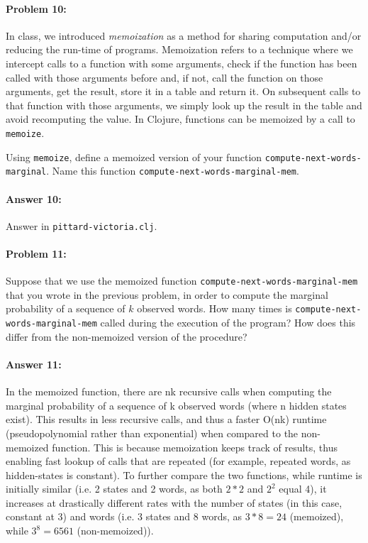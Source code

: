 \documentclass[10pt]{article}
\begin{document}
\hrulefill
\paragraph{Problem 10:}
In class, we introduced \emph{memoization} as a method for sharing
computation and/or reducing the run-time of programs. Memoization
refers to a technique where we intercept calls to a function with some
arguments, check if the function has been called with those arguments
before and, if not, call the function on those arguments, get the
result, store it in a table and return it. On subsequent calls to that
function with those arguments, we simply look up the result in the
table and avoid recomputing the value. In Clojure, functions can be
memoized by a call to \texttt{memoize}.

Using \texttt{memoize}, define a memoized version of your function
\texttt{compute-next-words-marginal}. Name this function
\texttt{compute-next-words-marginal-mem}.


\paragraph{Answer 10:} Answer in
\texttt{pittard-victoria.clj}.

\hrulefill
\paragraph{Problem 11:}
Suppose that we use the memoized function
\texttt{compute-next-words-marginal-mem} that you wrote in the
previous problem, in order to compute the marginal probability of a
sequence of $k$ observed words. How many times is
\texttt{compute-next-words-marginal-mem} called during the execution
of the program? How does this differ from the non-memoized version of
the procedure?


\paragraph{Answer 11:} In the memoized function, there are nk recursive calls when computing the marginal probability of a sequence of k observed words (where n hidden states exist). This results in less recursive calls, and thus a faster O(nk) runtime (pseudopolynomial rather than exponential) when compared to the non-memoized function. This is because memoization keeps track of results, thus enabling fast lookup of calls that are repeated (for example, repeated words, as hidden-states is constant). To further compare the two functions, while runtime is initially similar (i.e. 2 states and 2 words, as both $2*2$ and $2^2$ equal 4), it increases at drastically different rates with the number of states (in this case, constant at 3) and words (i.e. 3 states and 8 words, as $3*8=24$ (memoized), while $3^8=6561$ (non-memoized)).
\end{document}
